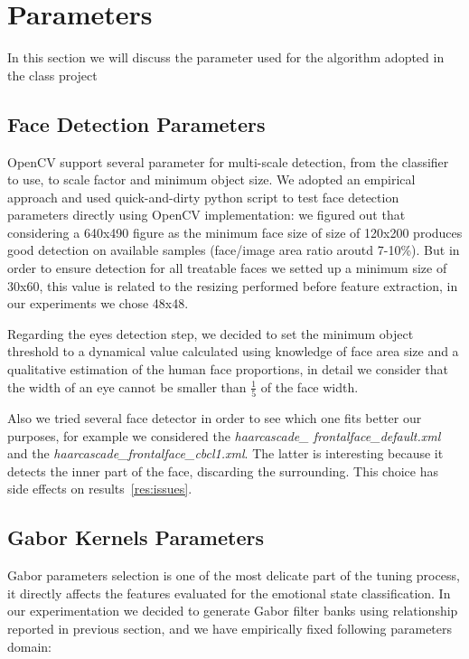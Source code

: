 \section{Parameters}

In this section we will discuss the parameter used for the algorithm adopted in the class project

\subsection{Face Detection Parameters}

OpenCV support several parameter for multi-scale detection, from the classifier to use, to scale factor and minimum object size. We adopted an empirical approach and used quick-and-dirty python script to test face detection parameters directly using OpenCV implementation: we figured out that considering a 640x490 figure as the minimum face size of size of 120x200 produces good detection on available samples (face/image area ratio aroutd 7-10\%). 
But in order to ensure detection for all treatable faces we setted up a minimum size of 30x60, this value is related to the resizing performed before feature extraction, in our experiments we chose 48x48.

Regarding the eyes detection step, we decided to set the minimum object threshold to a dynamical value calculated using knowledge of face area size and a qualitative estimation of the human face proportions, in detail we consider that the width of an eye cannot be smaller than $\frac{1}{5}$ of the face width.

Also we tried several face detector in order to see which one fits better our purposes, for example we considered the \emph{haarcascade\_ frontalface\_default.xml} and the \emph{haarcascade\_frontalface\_cbcl1.xml}. The latter is interesting because it detects the inner part of the face, discarding the surrounding. This choice has side effects on results~\ref{res:issues}.

\subsection{Gabor Kernels Parameters}

Gabor parameters selection is one of the most delicate part of the tuning process, it directly affects the features evaluated for the emotional state classification. 
In our experimentation we decided to generate Gabor filter banks using relationship reported in previous section, and we have empirically fixed following parameters domain:


